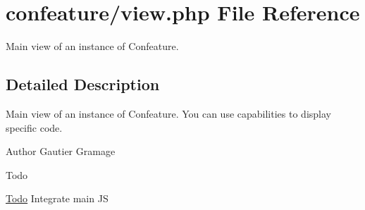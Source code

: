 \hypertarget{view_8php}{\section{confeature/view.php File Reference}
\label{view_8php}
}


Main view of an instance of Confeature.  




\subsection{Detailed Description}
Main view of an instance of Confeature. You can use capabilities to display specific code. \begin{DoxyAuthor}{Author}
Gautier Gramage 
\end{DoxyAuthor}
\begin{DoxyRefDesc}{Todo}
\item[\hyperlink{todo__todo000009}{Todo}]Integrate main J\-S \end{DoxyRefDesc}
